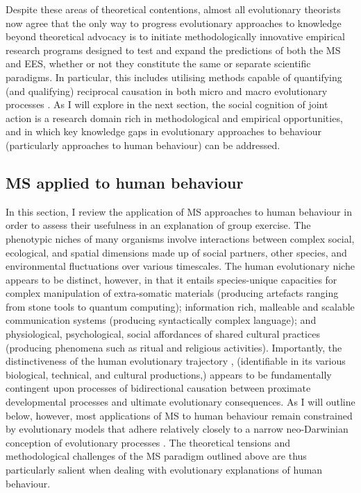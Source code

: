 Despite these areas of theoretical contentions, almost all evolutionary theorists now agree that the only way to progress evolutionary approaches to knowledge beyond theoretical advocacy is to initiate methodologically innovative empirical research programs designed to test and expand the predictions of both the MS and EES, whether or not they constitute the same or separate scientific paradigms.  In particular, this includes utilising methods capable of quantifying (and qualifying) reciprocal causation in both micro and macro evolutionary processes  \citep{Wray2014,Laland2014,Laland2015,Svensson2017}.  As I will explore in the next section, the social cognition of joint action is a research domain rich in methodological and empirical opportunities, and in which key knowledge gaps in evolutionary approaches to behaviour (particularly approaches to human behaviour) can be addressed.


  \subsection{MS applied to human behaviour}
In this section, I review the application of MS approaches to human behaviour in order to assess their usefulness in an explanation of group exercise.  The phenotypic niches of many organisms involve interactions between complex social, ecological, and spatial dimensions made up of social partners, other species, and environmental fluctuations over various timescales. The human evolutionary niche appears to be distinct, however, in that it entails species-unique capacities for complex manipulation of extra-somatic materials (producing artefacts ranging from stone tools to quantum computing); information rich, malleable and scalable communication systems (producing syntactically complex language); and physiological, psychological, social affordances of shared cultural practices (producing phenomena such as ritual and religious activities). Importantly, the distinctiveness of the human evolutionary trajectory , (identifiable in its various biological, technical, and cultural productions,) appears to be fundamentally contingent upon processes of bidirectional causation between proximate developmental processes and ultimate evolutionary consequences.  As I will outline below, however,
most applications of MS to human behaviour remain constrained by evolutionary models that adhere relatively closely to a narrow neo-Darwinian conception of evolutionary processes \citep{Claidiere2014,Mesoudi2017}.  The theoretical tensions and methodological challenges of the MS paradigm outlined above are thus particularly salient when dealing with evolutionary explanations of human behaviour.

